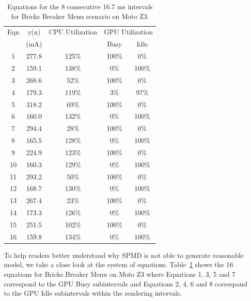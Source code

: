 \begin{table}[tb]
    \centering
    \caption{Equations for the 8 consecutive 16.7 ms intervals for Bricks Breaker Menu scenario on Moto Z3.}
    {\small
    \vspace{-0.1in}
    \begin{tabular}{|c|c|c|c|c|}
        \hline
             Eqn &    y(n) & \multicolumn{1}{c|}{CPU Utilization} & \multicolumn{2}{c|}{GPU Utilization} \\
        \cline{4-5}
             & (mA) & \multicolumn{1}{c|}{} & Busy & Idle \\
            \hline
               1 & 277.8 & 125\% & 100\% &   0\% \\
               2 & 159.1 & 138\% &   0\% & 100\% \\
               \hline
               3 & 268.6 &  52\% & 100\% &   0\% \\
               4 & 179.3 & 119\% &   3\% &  97\% \\
               \hline
               5 & 318.2 &  69\% & 100\% &   0\% \\
               6 & 160.0 & 132\% &   0\% & 100\% \\
               \hline
               7 & 294.4 &  28\% & 100\% &   0\% \\
               8 & 165.5 & 128\% &   0\% & 100\% \\
               \hline
               9 & 224.9 & 123\% & 100\% &   0\% \\
              10 & 160.3 & 129\% &   0\% & 100\% \\
              \hline
              11 & 293.2 &  50\% & 100\% &   0\% \\
              12 & 168.7 & 130\% &   0\% & 100\% \\
              \hline
              13 & 267.4 &  23\% & 100\% &   0\% \\
              14 & 173.3 & 126\% &   0\% & 100\% \\
              \hline
              15 & 251.5 & 102\% & 100\% &   0\% \\
              16 & 159.8 & 134\% &   0\% & 100\% \\

        \hline
    \end{tabular}
    }
    \label{tab:equations_micro}
    \vspace{-0.1in}
\end{table}

To help readers better understand why SPMD is not able to generate reasonable model,
we take a close look at the system of equations.
Table~\ref{tab:equations_micro} shows the 16 equations for Bricks
Breaker Menu on Moto Z3
where Equations 1, 3, 5 and 7 correspond to the GPU Busy subintervals
and Equations 2, 4, 6 and 8 correspond to the GPU Idle subintervals
within the rendering intervals.


